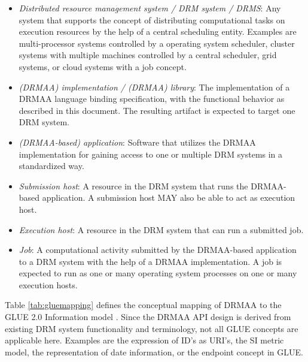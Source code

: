 \documentclass{article}
\begin{document}
\begin{itemize}
	\item \emph{Distributed resource management system / DRM system / DRMS}: Any system that supports the concept of distributing computational tasks on execution resources by the help of a central scheduling entity. Examples are multi-processor systems controlled by a operating system scheduler, cluster systems with multiple machines controlled by a central scheduler, grid systems, or cloud systems with a job concept.  
	\item \emph{(DRMAA) implementation / (DRMAA) library}: The implementation of a DRMAA language binding specification, with the functional behavior as described in this document. The resulting artifact is expected to target one DRM system. 
	\item \emph{(DRMAA-based) application}: Software that utilizes the DRMAA implementation for gaining access to one or multiple DRM systems in a standardized way.  
	\item \emph{Submission host}: A resource in the DRM system that runs the DRMAA-based application. A submission host MAY also be able to act as execution host.
	\item \emph{Execution host}: A resource in the DRM system that can run a submitted job. 
	\item \emph{Job}: A computational activity submitted by the DRMAA-based application to a DRM system with the help of a DRMAA implementation. A job is expected to run as one or many operating system processes on one or many execution hosts. 
\end{itemize}

Table \ref{tab:gluemapping} defines the conceptual mapping of DRMAA to the GLUE 2.0 Information model \cite{gfd.147}. Since the DRMAA API design is derived from existing DRM system functionality and terminology, not all GLUE concepts are applicable here. Examples are the expression of ID's as URI's, the SI metric model, the representation of date information, or the endpoint concept in GLUE.
\end{document}
